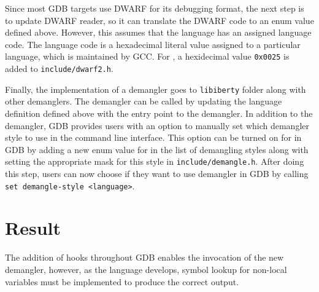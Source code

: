 Since most GDB targets use DWARF for its debugging format, the next step is to
update DWARF reader, so it can translate the DWARF code to an enum value defined
above. However, this assumes that the language has an assigned language code.
The language code is a hexadecimal literal value assigned to a particular
language, which is maintained by GCC. For \CFA, a hexidecimal value
\verb|0x0025| is added to \verb|include/dwarf2.h|.

Finally, the implementation of a demangler goes to \verb|libiberty| folder along with
other demanglers. The demangler can be called by updating the language
definition defined above with the entry point to the \CFAS demangler.
In addition to the demangler, GDB provides users with an option
to manually set which demangler style to use in the command line interface.
This option can be turned on for \CFAS in GDB by adding a new enum value for \CFAS in
the list of demangling styles along with setting the appropriate mask for this
style in \verb|include/demangle.h|. After doing this step, users can now choose
if they want to use \CFAS demangler in GDB by calling \verb|set demangle-style <language>|.

\section{Result}
The addition of hooks throughout GDB enables the invocation of the new \CFAS demangler, however, as the
language develops, symbol lookup for non-local variables must be implemented to
produce the correct output.

